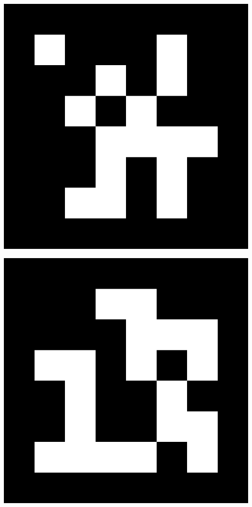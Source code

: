 \newpage
\myemptypage
\vspace{5cm}
\begin{center}
\includegraphics[width=\textwidth, keepaspectratio]{aruco_07.png}
\end{center}
\newpage
\myemptypage
\vspace{5cm}
\begin{center}
\includegraphics[width=\textwidth, keepaspectratio]{aruco_08.png}
\end{center}
